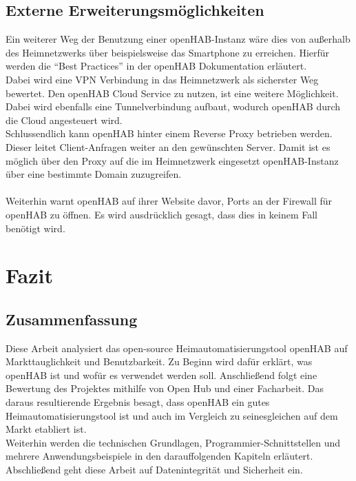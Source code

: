 \subsection{Externe Erweiterungsmöglichkeiten}
Ein weiterer Weg der Benutzung einer openHAB-Instanz wäre dies von außerhalb des Heimnetzwerks über beispielsweise das Smartphone zu erreichen. Hierfür werden die "`Best Practices"' in der openHAB Dokumentation erläutert.\\
Dabei wird eine VPN Verbindung in das Heimnetzwerk als sicherster Weg bewertet. Den openHAB Cloud Service zu nutzen, ist eine weitere Möglichkeit. Dabei wird ebenfalls eine Tunnelverbindung aufbaut, wodurch openHAB durch die Cloud angesteuert wird.\\
Schlussendlich kann openHAB hinter einem Reverse Proxy betrieben werden. Dieser leitet Client-Anfragen weiter an den gewünschten Server. Damit ist es möglich über den Proxy auf die im Heimnetzwerk eingesetzt openHAB-Instanz über eine bestimmte Domain zuzugreifen.\\
\\
Weiterhin warnt openHAB auf ihrer Website davor, Ports an der Firewall für openHAB zu öffnen. Es wird ausdrücklich gesagt, dass dies in keinem Fall benötigt wird.\cite{openHAB03:OH}

\section{Fazit}
\subsection{Zusammenfassung}
Diese Arbeit analysiert das open-source Heimautomatisierungstool openHAB auf Markttauglichkeit und Benutzbarkeit. Zu Beginn wird dafür erklärt, was openHAB ist und wofür es verwendet werden soll. Anschließend folgt eine Bewertung des Projektes mithilfe von Open Hub und einer Facharbeit. Das daraus resultierende Ergebnis besagt, dass openHAB ein gutes Heimautomatisierungstool ist und auch im Vergleich zu seinesgleichen auf dem Markt etabliert ist.\\
Weiterhin werden die technischen Grundlagen, Programmier-Schnittstellen und mehrere Anwendungsbeispiele in den darauffolgenden Kapiteln erläutert.\\
Abschließend geht diese Arbeit auf Datenintegrität und Sicherheit ein.

